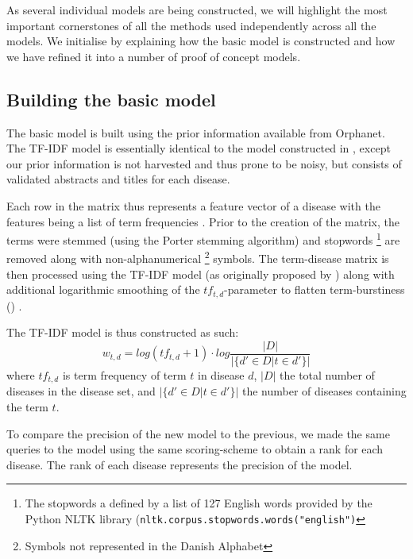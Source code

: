 \documentclass[10pt,letterpaper,final]{article}
\begin{document}
As several individual models are being constructed, we will highlight
the most important cornerstones of all the methods used independently
across all the models.
We initialise by explaining how the basic model is constructed and how
we have refined it into a number of proof of concept models.


\subsection{Building the basic model}
The basic model is built using the prior information available
from Orphanet. The TF-IDF model is essentially identical to the model
constructed in \cite{jensenandersen}, except our prior information is
not harvested and thus prone to be noisy, but consists of validated
abstracts and titles for each disease.


Each row in the matrix thus represents a feature vector of a disease
with the features being a list of term frequencies . Prior to the
creation of the matrix, the terms were stemmed (using the Porter
stemming algorithm) and stopwords \footnote{The stopwords a defined by a
list of 127 English words provided by the Python NLTK library
(\texttt{nltk.corpus.stopwords.words("english")}} are removed along
with non-alphanumerical \footnote{Symbols not represented in the Danish
Alphabet} symbols. The term-disease matrix is then processed using the
TF-IDF model (as originally proposed by \cite{tfidf}) along with
additional logarithmic smoothing of the $tf_{t,d}$-parameter to flatten
term-burstiness (\cite{burstiness}) .

The TF-IDF model is thus constructed as such:
\[
w_{t,d} = log(tf_{t,d}+1)\cdot log\frac{|D|}{|\{d'\in D|t\in d'\}|}
\]
where $tf_{t,d}$ is term frequency of term $t$ in disease $d$, $|D|$ 
the total number of diseases in the disease set, and $|\{d'\in D|t\in
d'\}|$ the number of diseases containing the term $t$.

To compare the precision of the new model to the previous, we made the
same queries to the model using the same scoring-scheme to obtain a rank
for each disease. The rank of each disease represents the precision of
the model.
\end{document}
